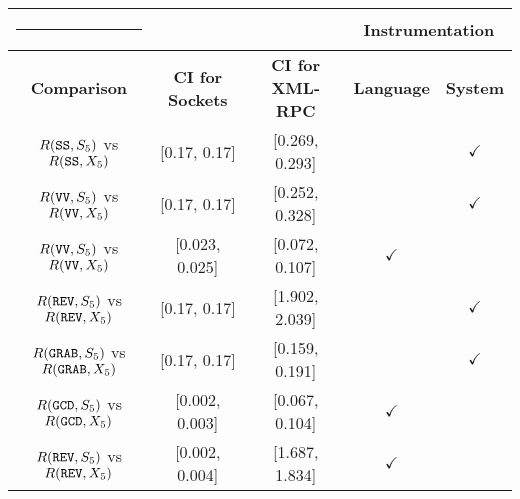 \documentclass{sig-alternate}
\begin{document}
\begin{table*}[t]

\begin{center}
\begin{tabular}{cccc|c|}

\cline{4-5}

\begin{minipage}{1in}\rule{-.1in}{14pt}\end{minipage}  &                      &                      & \multicolumn{2}{|c|}{{\bf Instrumentation}} \\
\hline
\multicolumn{1}{|c||}{{\bf Comparison}} & \multicolumn{1}{|c|}{{\bf CI for Sockets}} & \multicolumn{1}{|c|}{{\bf CI for XML-RPC}} & {\bf Language} & {\bf System} \\
\hline

 \multicolumn{1}{|c||}{$R(\mbox{\texttt{SS}},S_{5})$ vs $ R(\mbox{\texttt{SS}},X_{5})$}  & \multicolumn{1}{|c|}{[0.17, 0.17]} & \multicolumn{1}{|c|}{[0.269, 0.293]} & & $\checkmark$ \\

\hline
\multicolumn{1}{|c||}{$R(\mbox{\texttt{VV}},S_{5})$ vs $R(\mbox{\texttt{VV}},X_{5})$}  & \multicolumn{1}{|c|}{[0.17, 0.17]} & \multicolumn{1}{|c|}{[0.252, 0.328]} & & $\checkmark$ \\

\hline
\multicolumn{1}{|c||}{$R(\mbox{\texttt{VV}},S_{5})$ vs $R(\mbox{\texttt{VV}},X_{5})$} & \multicolumn{1}{|c|}{[0.023, 0.025]} & \multicolumn{1}{|c|}{[0.072, 0.107]} & $\checkmark$ & \\

\hline
\multicolumn{1}{|c||}{$R(\mbox{\texttt{REV}},S_{5})$ vs $R(\mbox{\texttt{REV}},X_{5})$} & \multicolumn{1}{|c|}{[0.17, 0.17]} & \multicolumn{1}{|c|}{[1.902, 2.039]} & & $\checkmark$ \\

\hline
\multicolumn{1}{|c||}{$R(\mbox{\texttt{GRAB}},S_{5})$ vs $R(\mbox{\texttt{GRAB}},X_{5})$} & \multicolumn{1}{|c|}{[0.17, 0.17]} & \multicolumn{1}{|c|}{[0.159, 0.191]} & & $\checkmark$ \\

\hline
\multicolumn{1}{|c||}{$R(\mbox{\texttt{GCD}},S_{5})$ vs $R(\mbox{\texttt{GCD}},X_{5})$} & \multicolumn{1}{|c|}{[0.002, 0.003]} & \multicolumn{1}{|c|}{[0.067, 0.104]} & $\checkmark$ & \\

\hline
\multicolumn{1}{|c||}{$R(\mbox{\texttt{REV}},S_{5})$ vs $R(\mbox{\texttt{REV}},X_{5})$} & \multicolumn{1}{|c|}{[0.002, 0.004]} & \multicolumn{1}{|c|}{[1.687, 1.834]} & $\checkmark$ & \\


\end{tabular}
\end{center}
\end{table*}
\end{document}
